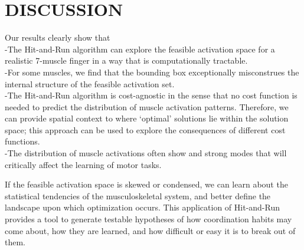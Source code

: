 \section{DISCUSSION}

Our results clearly show that\\
-The Hit-and-Run algorithm can explore the feasible activation space for a realistic 7-muscle finger in a way that is computationally tractable.\\
-For some muscles, we find that the bounding box exceptionally misconstrues the internal structure of the feasible activation set.\\
-The Hit-and-Run algorithm is cost-agnostic in the sense that no cost function is needed to predict the distribution of muscle activation patterns. Therefore, we can provide spatial context to where `optimal' solutions lie within the solution space; this approach can be used to explore the consequences of different cost functions.\\
-The distribution of muscle activations often show and strong modes that will critically affect the learning of motor tasks.


If the feasible activation space is skewed or condensed, we can learn about the statistical tendencies of the musculoskeletal system, and better define the landscape upon which optimization occurs. This application of Hit-and-Run provides a tool to generate testable hypotheses of how coordination habits may come about, how they are learned, and how difficult or easy it is to break out of them. 


